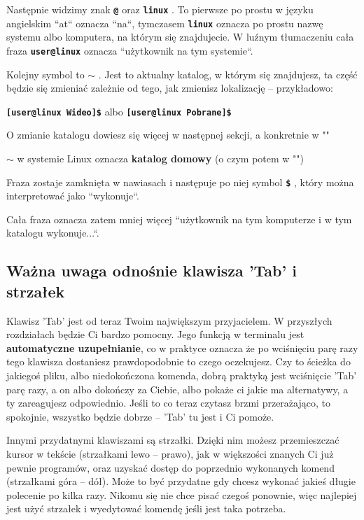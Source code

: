 \documentclass[11pt, a4paper]{article}
\newcommand{\ttbf}[1]{
    \texttt{\textbf{#1}}
}
\begin{document}
Następnie widzimy znak \ttbf{@} oraz \ttbf{linux}. To pierwsze po prostu w języku angielskim ``at`` oznacza ``na``, tymczasem \ttbf{linux} oznacza po prostu nazwę systemu albo komputera, na którym się znajdujecie. W luźnym tłumaczeniu cała fraza \ttbf{user@linux} oznacza ``użytkownik na tym systemie``.

Kolejny symbol to \ttbf{$\sim$}. Jest to aktualny katalog, w którym się znajdujesz, ta część będzie się zmieniać zależnie od tego, jak zmienisz lokalizację -- przykładowo:

\ttbf{[user@linux Wideo]\$} albo \ttbf{[user@linux Pobrane]\$}

O zmianie katalogu dowiesz się więcej w następnej sekcji, a konkretnie w ""

\ttbf{$\sim$} w systemie Linux oznacza \textbf{katalog domowy} (o czym potem w "")

Fraza zostaje zamknięta w nawiasach i następuje po niej symbol \ttbf{\$}, który można interpretować jako ``wykonuje``.

Cała fraza oznacza zatem mniej więcej ``użytkownik na tym komputerze i w tym katalogu wykonuje...``.

\subsection{Ważna uwaga odnośnie klawisza 'Tab' i strzałek}

Klawisz 'Tab' jest od teraz Twoim największym przyjacielem. W przyszłych rozdziałach będzie Ci bardzo pomocny. Jego funkcją w terminalu jest \textbf{automatyczne uzupełnianie}, co w praktyce oznacza że po wciśnięciu parę razy tego klawisza dostaniesz prawdopodobnie to czego oczekujesz. Czy to ścieżka do jakiegoś pliku, albo niedokończona komenda, dobrą praktyką jest wciśnięcie 'Tab' parę razy, a on albo dokończy za Ciebie, albo pokaże ci jakie ma alternatywy, a ty zareagujesz odpowiednio. Jeśli to co teraz czytasz brzmi przerażająco, to spokojnie, wszystko będzie dobrze -- 'Tab' tu jest i Ci pomoże.

Innymi przydatnymi klawiszami są strzałki. Dzięki nim możesz przemieszczać kursor w tekście (strzałkami lewo -- prawo), jak w większości znanych Ci już pewnie programów, oraz uzyskać dostęp do poprzednio wykonanych komend (strzałkami góra -- dół). Może to być przydatne gdy chcesz wykonać jakieś długie polecenie po kilka razy. Nikomu się nie chce pisać czegoś ponownie, więc najlepiej jest użyć strzałek i wyedytować komendę jeśli jest taka potrzeba.
\end{document}
